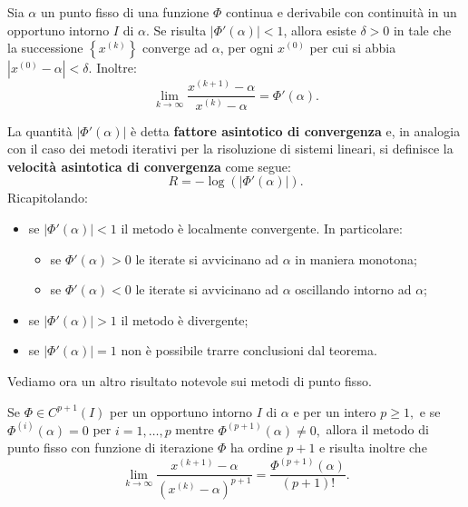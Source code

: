 \begin{theorem}
[di Ostrowski]
\label{thm:ostrowski}
Sia $\alpha $ un punto fisso di una funzione $\Phi $ continua e derivabile con continuità in un opportuno intorno $I$ di $\alpha $. Se risulta $| \Phi '(\alpha )| < 1$, allora esiste $\delta  >0$ in tale che la successione $\left\{x^{(k)}\right\}$ converge ad $\alpha $, per ogni $x^{(0)}$ per cui si abbia $\left| x^{(0)} -\alpha \right| < \delta $. Inoltre:
\begin{equation*}
\lim _{k\rightarrow \infty }\frac{x^{(k+1)} -\alpha }{x^{(k)} -\alpha } =\Phi '(\alpha ).
\end{equation*}
\end{theorem}
La quantità $| \Phi '(\alpha )| $ è detta \textbf{fattore asintotico di convergenza} e, in analogia con il caso dei metodi iterativi per la risoluzione di sistemi lineari, si definisce la \textbf{velocità asintotica di convergenza} come segue:
\begin{equation*}
R=-\log(| \Phi '(\alpha )| ).
\end{equation*}
Ricapitolando:
\begin{itemize}
\item se $| \Phi '(\alpha )| < 1$ il metodo è localmente convergente. In particolare:
\begin{itemize}
\item se $\Phi '(\alpha ) >0$ le iterate si avvicinano ad $\alpha $ in maniera monotona;
\item se $\Phi '(\alpha )< 0$ le iterate si avvicinano ad $\alpha $ oscillando intorno ad $\alpha $;
\end{itemize}
\item se $| \Phi '(\alpha )|  >1$ il metodo è divergente;
\item se $| \Phi '(\alpha )| =1$ non è possibile trarre conclusioni dal teorema.
\end{itemize}
Vediamo ora un altro risultato notevole sui metodi di punto fisso.
\begin{theorem}
Se $\Phi \in C^{p+1} (I)$ per un opportuno intorno $I$ di $\alpha $ e per un intero $p\geqslant 1,$ e se $\Phi ^{(i)} (\alpha )=0$ per $i=1,\dotsc ,p$ mentre $\Phi ^{(p+1)} (\alpha )\neq 0,$ allora il metodo di punto fisso con funzione di iterazione $\Phi $ ha ordine $p+1$ e risulta inoltre che
\begin{equation*}
\lim _{k\rightarrow \infty }\frac{x^{(k+1)} -\alpha }{\left( x^{(k)} -\alpha \right)^{p+1}} =\frac{\Phi ^{(p+1)} (\alpha )}{(p+1)!}.
\end{equation*}
\end{theorem}

